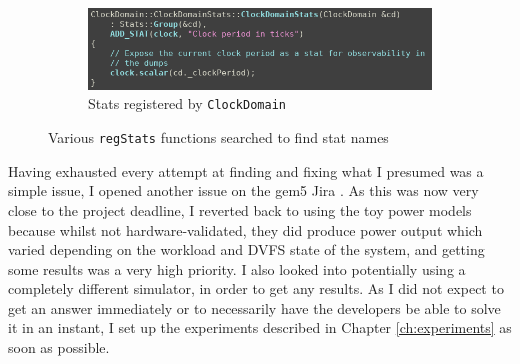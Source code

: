 \begin{figure}[H]
\begin{minipage}[b]{0.45\textwidth}
\begin{subfigure}[b]{\linewidth}
            \centering
            \includegraphics[width=\textwidth]{screenshots/have-to-search-src-for-regStats/clock-domain-registers-a-stat.png}
            \caption{Stats registered by \texttt{ClockDomain}}
            \label{subfig:clk-dom-regStats}
        \end{subfigure}
    \end{minipage}
    \caption{Various \texttt{regStats} functions searched to find stat 
             names}
    \label{fig:regstats-search}
\end{figure}

Having exhausted every attempt at finding and fixing what I presumed was a 
simple issue, I opened another issue on the gem5 Jira 
\cite{hansen_gem5-463_2020}. As this was now very close to the project 
deadline, I reverted back to using the toy power models because whilst not 
hardware-validated, they did produce power output which varied depending on 
the workload and DVFS state of the system, and getting some results was a 
very high priority. I also looked into potentially using a completely 
different simulator, in order to get any results. As I did not expect to 
get an answer immediately or to necessarily have the developers be able to 
solve it in an instant, I set up the experiments described in Chapter 
\ref{ch:experiments} as soon as possible.


